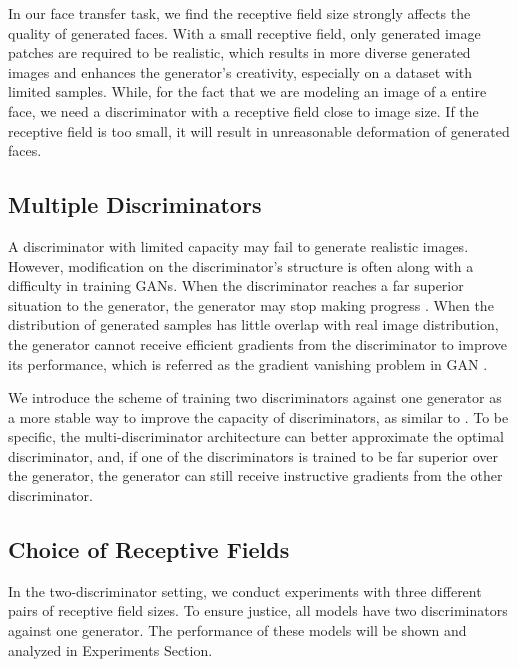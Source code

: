 \documentclass[letterpaper]{article} %
\newcommand{\zhiming}[1]{{\bf \color{blue} [Zhiming says: #1]}}
\begin{document}
	In our face transfer task, we find the receptive field size strongly affects the quality of generated faces. With a small receptive field, only generated image patches are required to be realistic, which results in more diverse generated images and enhances the generator's creativity, especially on a dataset with limited samples. While, for the fact that we are modeling an image of a entire face, we need a discriminator with a receptive field close to image size. If the receptive field is too small, it will result in unreasonable deformation of generated faces.  
	
	\subsection{Multiple Discriminators}
	A discriminator with limited capacity may fail to generate realistic images. However, modification on the discriminator's structure is often along with a difficulty in training GANs. When the discriminator reaches a far superior situation to the generator, the generator may stop making progress \cite{durugkar2016generative,arjovsky2017towards,neyshabur2017stabilizing}. When the distribution of generated samples has little overlap with real image distribution, the generator cannot receive efficient gradients from the discriminator to improve its performance, which is referred as the gradient vanishing problem in GAN \cite{arjovsky2017wasserstein}.
	
	We introduce the scheme of training two discriminators against one generator as a more stable way to improve the capacity of discriminators, as similar to \cite{durugkar2016generative}. To be specific, the multi-discriminator architecture can better approximate the optimal discriminator, and, if one of the discriminators is trained to be far superior over the generator, the generator can still receive instructive gradients from the other discriminator. %
	
	\subsection{Choice of Receptive Fields}
	In the two-discriminator setting, we conduct experiments with three different pairs of receptive field sizes. To ensure justice, all models have two discriminators against one generator. The performance of these models will be shown and analyzed in Experiments Section. 
	
\end{document}
